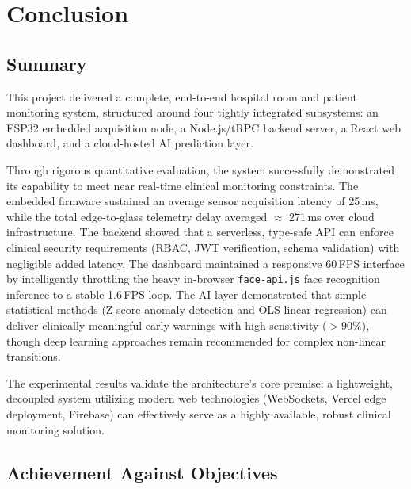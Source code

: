 
\chapter{Conclusion}
\label{ch:conclusion}

\section{Summary}

This project delivered a complete, end-to-end hospital room and patient monitoring
system, structured around four tightly integrated subsystems: an ESP32\cite{esp32_datasheet} embedded
acquisition node, a Node.js/tRPC\cite{trpc} backend server, a React\cite{react} web dashboard, and a
cloud-hosted AI prediction layer.

Through rigorous quantitative evaluation, the system successfully demonstrated its capability to meet near real-time clinical monitoring constraints. The embedded firmware sustained an average sensor acquisition latency of 25\,ms, while the total edge-to-glass telemetry delay averaged $\approx$ 271\,ms over cloud infrastructure. The backend showed that a serverless, type-safe API can enforce clinical security requirements (RBAC, JWT verification, schema validation) with negligible added latency. The dashboard maintained a responsive 60\,FPS interface by intelligently throttling the heavy in-browser \texttt{face-api.js}\cite{faceapi} face recognition inference to a stable 1.6\,FPS loop. The AI layer demonstrated that simple statistical methods (Z-score anomaly detection and OLS linear regression) can deliver clinically meaningful early warnings with high sensitivity ($>90\%$), though deep learning approaches remain recommended for complex non-linear transitions.

The experimental results validate the architecture's core premise: a lightweight, decoupled system utilizing modern web technologies (WebSockets, Vercel\cite{vercel} edge deployment, Firebase\cite{firebase_rtdb}) can effectively serve as a highly available, robust clinical monitoring solution.

\section{Achievement Against Objectives}

